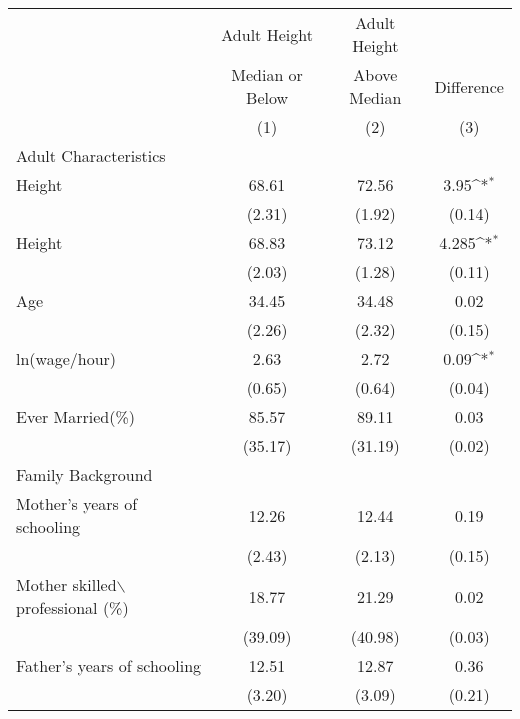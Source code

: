\documentclass[12pt]{article}
\begin{document}
\clearpage
\def\sym#1{\ifmmode^{#1}\else\(^{#1}\)\fi}
 \todo
\begin{table}[h!]
    \begin{tabular}{|l | c | c | c |} 
        \hline 
         & Adult Height  & 
           Adult Height  & 
            \\
         & Median or Below  & 
           Above Median & 
            Difference \\
         & (1) & 
           (2) & 
           (3) \\
        \hline
        Adult Characteristics & & &\\
        \hline
        \tabindent 1981 Height & 68.61  & 72.56  & 3.95\sym{*} \\
                            & (2.31) & (1.92) & (0.14)\\
        \hline
        \tabindent 1985 Height & 68.83  & 73.12  & 4.285\sym{*} \\
                           & (2.03) & (1.28) &  (0.11) \\
        \hline
        \tabindent Age     & 34.45  & 34.48  & 0.02 \\
                           & (2.26) & (2.32) &  (0.15)       \\
        \hline
        \tabindent ln(wage/hour)     & 2.63   & 2.72  & 0.09\sym{*} \\
                                     & (0.65) & (0.64) &  (0.04)       \\
        \hline
        \tabindent Ever Married(\%)  & 85.57  & 89.11 & 0.03 \\
                                     & (35.17) & (31.19) & (0.02) \\
        \hline
        Family Background & & & \\
        \hline
        \tabindent Mother's years of schooling & 12.26 & 12.44 & 0.19\\
                                               & (2.43) & (2.13) & (0.15) \\
        \hline
        \tabindent Mother skilled$\backslash$professional (\%) & 18.77 & 21.29 & 0.02 \\
                                                 & (39.09) & (40.98) & (0.03) \\
        \hline
        \tabindent Father's years of schooling & 12.51 & 12.87 & 0.36 \\
                                               & (3.20) & (3.09) & (0.21) \\

\end{tabular}
\end{table}
\end{document}
